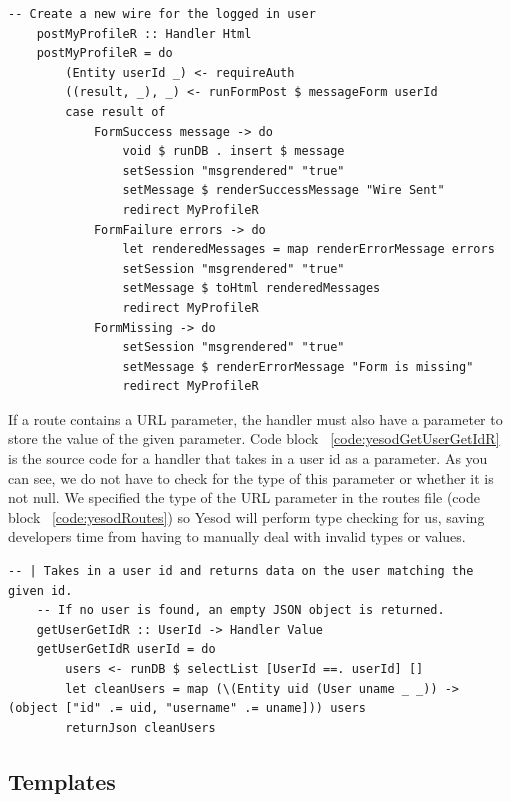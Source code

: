 \begin{lstlisting}[caption={POST request handler for current profile page},label={code:yesodPostProfileR}]
    -- Create a new wire for the logged in user
    postMyProfileR :: Handler Html
    postMyProfileR = do
        (Entity userId _) <- requireAuth
        ((result, _), _) <- runFormPost $ messageForm userId
        case result of
            FormSuccess message -> do
                void $ runDB . insert $ message
                setSession "msgrendered" "true"
                setMessage $ renderSuccessMessage "Wire Sent"
                redirect MyProfileR
            FormFailure errors -> do
                let renderedMessages = map renderErrorMessage errors
                setSession "msgrendered" "true"
                setMessage $ toHtml renderedMessages
                redirect MyProfileR
            FormMissing -> do
                setSession "msgrendered" "true"
                setMessage $ renderErrorMessage "Form is missing"
                redirect MyProfileR
\end{lstlisting}

If a route contains a URL parameter, the handler must also have a parameter to store
the value of the given parameter. Code block ~\ref{code:yesodGetUserGetIdR} is the
source code for a handler that takes in a user id as a parameter. As you can see,
we do not have to check for the type of this parameter or whether it is not null.
We specified the type of the URL parameter in the routes file (code block ~\ref{code:yesodRoutes})
so Yesod will perform type checking for us, saving developers time from having
to manually deal with invalid types or values.

\begin{lstlisting}[caption={GET request handler for getting user data},label={code:yesodGetUserGetIdR}]
    -- | Takes in a user id and returns data on the user matching the given id.
    -- If no user is found, an empty JSON object is returned.
    getUserGetIdR :: UserId -> Handler Value
    getUserGetIdR userId = do
        users <- runDB $ selectList [UserId ==. userId] []
        let cleanUsers = map (\(Entity uid (User uname _ _)) -> (object ["id" .= uid, "username" .= uname])) users
        returnJson cleanUsers
\end{lstlisting}

\subsection{Templates}

